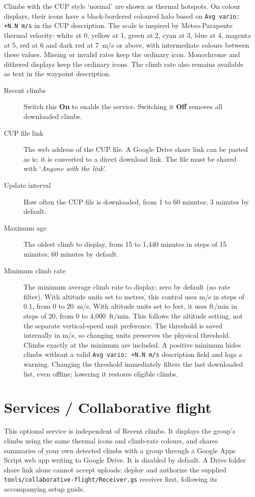 Climbs with the CUP style `normal' are shown as thermal hotspots.
On colour displays, their icons have a black-bordered coloured halo
based on \texttt{Avg vario: +N.N m/s} in the CUP description.
The scale is inspired by Meteo-Parapente thermal velocity: white at
0, yellow at 1, green at 2, cyan at 3, blue at 4, magenta at 5, red at
6 and dark red at 7~m/s or above, with intermediate colours between
these values. Missing or invalid rates keep the ordinary icon.
Monochrome and dithered displays keep the ordinary icons. The climb
rate also remains available as text in the waypoint description.

\begin{description}
\item[Recent climbs]  Switch this {\bf On} to enable the service.
  Switching it {\bf Off} removes all downloaded climbs.
\item[CUP file link]  The web address of the CUP file. A Google Drive
  share link can be pasted as is; it is converted to a direct
  download link. The file must be shared with `{\em Anyone with the
  link}'.
\item[Update interval]  How often the CUP file is downloaded, from
  1 to 60 minutes; 3 minutes by default.
\item[Maximum age]  The oldest climb to display, from 15 to 1,440
  minutes in steps of 15 minutes; 60 minutes by default.
\item[Minimum climb rate]  The minimum average climb rate to display;
  zero by default (no rate filter). With altitude units set to metres,
  this control uses m/s in steps of 0.1, from 0 to 20~m/s. With altitude
  units set to feet, it uses ft/min in steps of 20, from 0 to 4,000~ft/min.
  This follows the altitude setting, not the separate vertical-speed
  unit preference. The threshold is saved internally in m/s, so changing
  units preserves the physical threshold. Climbs exactly at the minimum
  are included. A positive minimum hides climbs without a valid
  \texttt{Avg vario: +N.N m/s} description field and logs a warning.
  Changing the threshold immediately filters the last downloaded list,
  even offline; lowering it restores eligible climbs.
\end{description}


\section{Services / Collaborative flight}

This optional service is independent of Recent climbs. It displays the group's
climbs using the same thermal icons and climb-rate colours, and shares summaries
of your own detected climbs with a group through a Google Apps Script web
app writing to Google Drive. It is disabled by default. A Drive folder
share link alone cannot accept uploads: deploy and authorize the supplied
\texttt{tools/collaborative-flight/Receiver.gs} receiver first, following
its accompanying setup guide.

